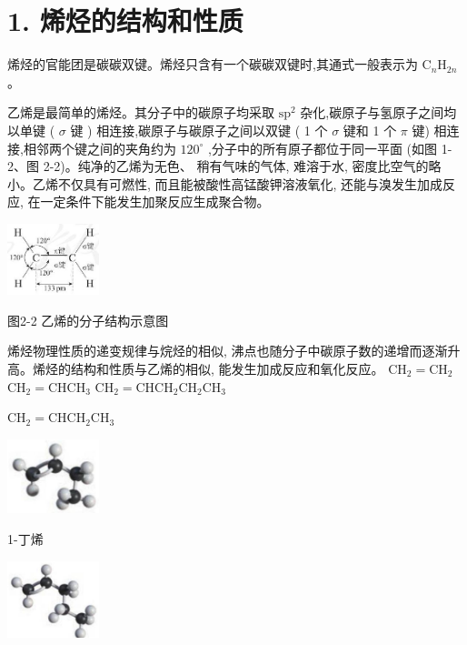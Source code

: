 \documentclass[10pt]{article}
\begin{document}
\section*{1. 烯烃的结构和性质}

烯烃的官能团是碳碳双键。烯烃只含有一个碳碳双键时,其通式一般表示为 \({\mathrm{C}}_{n}{\mathrm{H}}_{2n}\) 。

乙烯是最简单的烯烃。其分子中的碳原子均采取 \({\mathrm{{sp}}}^{2}\) 杂化,碳原子与氢原子之间均以单键 ( \(\sigma\) 键 ) 相连接,碳原子与碳原子之间以双键 ( 1 个 \(\sigma\) 键和 1 个 \(\pi\) 键) 相连接,相邻两个键之间的夹角约为 \({120}^{ \circ }\) ,分子中的所有原子都位于同一平面 (如图 1-2、图 2-2)。纯净的乙烯为无色、 稍有气味的气体, 难溶于水, 密度比空气的略小。乙烯不仅具有可燃性, 而且能被酸性高锰酸钾溶液氧化, 还能与溴发生加成反应, 在一定条件下能发生加聚反应生成聚合物。

\begin{center}
\includegraphics[max width=0.2\textwidth]{images/0190efc5-b58a-7c43-bfb0-e0a030df9cfd_39_510339.jpg}
\end{center}

图2-2 乙烯的分子结构示意图

烯烃物理性质的递变规律与烷烃的相似, 沸点也随分子中碳原子数的递增而逐渐升高。烯烃的结构和性质与乙烯的相似, 能发生加成反应和氧化反应。 \({\mathrm{{CH}}}_{2} = {\mathrm{{CH}}}_{2}\) \({\mathrm{{CH}}}_{2} = {\mathrm{{CHCH}}}_{3}\) \({\mathrm{{CH}}}_{2} = {\mathrm{{CHCH}}}_{2}{\mathrm{{CH}}}_{2}{\mathrm{{CH}}}_{3}\)

\({\mathrm{{CH}}}_{2} = {\mathrm{{CHCH}}}_{2}{\mathrm{{CH}}}_{3}\)

\begin{center}
\includegraphics[max width=0.2\textwidth]{images/0190efc5-b58a-7c43-bfb0-e0a030df9cfd_40_464871.jpg}
\end{center}

1-丁烯

\begin{center}
\includegraphics[max width=0.2\textwidth]{images/0190efc5-b58a-7c43-bfb0-e0a030df9cfd_40_767359.jpg}
\end{center}
\end{document}
